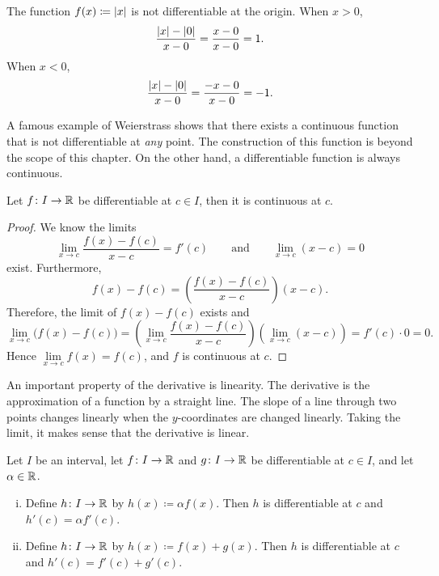 \begin{example}
The function $f(x) \coloneqq \left\lvert {x} \right\rvert$ is not differentiable
at the origin.  When $x > 0$,
\begin{equation*}
\frac{\left\lvert {x} \right\rvert-\left\lvert {0} \right\rvert}{x-0} =
\frac{x-0}{x-0} = 1 .
\end{equation*}
When $x < 0$,
\begin{equation*}
\frac{\left\lvert {x} \right\rvert-\left\lvert {0} \right\rvert}{x-0} =
\frac{-x-0}{x-0} = -1 .
\end{equation*}
\end{example}

A famous example of Weierstrass shows that there exists a continuous
function that is not differentiable at \emph{any} point.  The construction
of this function is beyond the scope of this chapter.  On the other hand,
a differentiable function is always continuous.

\begin{prop}
Let $f \colon I \to {\mathbb{R}}$ be differentiable at $c \in I$,
then it is continuous at $c$.
\end{prop}

\begin{proof}
We know the limits
\begin{equation*}
\lim_{x\to c}\frac{f(x)-f(c)}{x-c} = f'(c)
\qquad
\text{and}
\qquad
\lim_{x\to c}(x-c) = 0
\end{equation*}
exist.  Furthermore,
\begin{equation*}
f(x)-f(c) = 
\left( \frac{f(x)-f(c)}{x-c} \right) (x-c) .
\end{equation*}
Therefore, the limit of $f(x)-f(c)$ exists and
\begin{equation*}
\lim_{x\to c} \bigl( f(x)-f(c) \bigr) =
\left(\lim_{x\to c} \frac{f(x)-f(c)}{x-c} \right)
\left(\lim_{x\to c} (x-c) \right) =
f'(c) \cdot 0  = 0.
\end{equation*}
Hence $\lim\limits_{x\to c} f(x) = f(c)$, and $f$ is continuous at $c$.
\end{proof}

An important property of the derivative is linearity.  The
derivative is the approximation of a function by a straight line.
The slope of a line through two points changes linearly when the
$y$-coordinates are changed linearly.  Taking the limit,
it makes sense that the derivative is linear.

\begin{prop}[Linearity]
Let $I$ be an interval, let
$f \colon I \to {\mathbb{R}}$ and $g \colon I \to {\mathbb{R}}$ be differentiable at $c \in I$,
and let $\alpha \in {\mathbb{R}}$.
\begin{enumerate}[(i)]
\item
Define $h \colon I \to {\mathbb{R}}$ by $h(x) \coloneqq \alpha f(x)$.  Then
$h$ is differentiable at $c$ and
$h'(c) = \alpha f'(c)$.
\item
Define $h \colon I \to {\mathbb{R}}$ by $h(x) \coloneqq  f(x) + g(x)$.  Then
$h$ is differentiable at $c$ and
$h'(c) =  f'(c) + g'(c)$.
\end{enumerate}
\end{prop}

